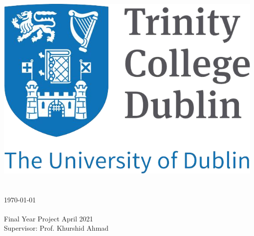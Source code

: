 \begin{titlepage}

\center %


\includegraphics[scale=0.35]{title/tcd.png}\\[2cm] 


\makeatletter
{ \huge \bfseries \thesistitle}\\[1.5cm] %
 
\Large\authorname\\
{\large \today}\\[1cm] %

 
\degree\\
Final Year Project  April 2021\\
Supervisor: Prof. Khurshid Ahmad\\[2cm]

\vfill

\Large \school\\[0.5cm]
\Large \schoolAddress

\vfill %

\end{titlepage}